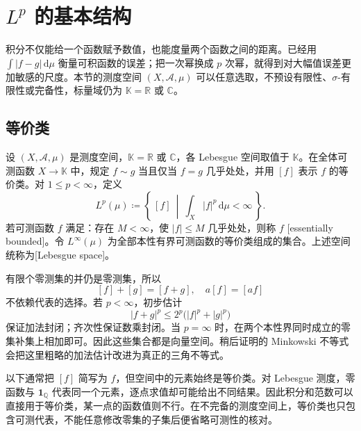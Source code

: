 \section{\texorpdfstring{\(L^p\)}{Lᵖ} 的基本结构}
\label{b1:sec:1001}

积分不仅能给一个函数赋予数值，也能度量两个函数之间的距离。已经用 \(\int|f-g|\,\mathrm d\mu\) 衡量可积函数的误差；把一次幂换成 \(p\) 次幂，就得到对大幅值误差更加敏感的尺度。本节的测度空间 \((X,\mathcal A,\mu)\) 可以任意选取，不预设有限性、\(\sigma\)-有限性或完备性，标量域仍为 \(\mathbb K=\mathbb R\) 或 \(\mathbb C\)。

\subsection{等价类}
\label{b1:subsec:100101}

\begin{definition}\label{b1:def:lp-space}
设 \((X,\mathcal A,\mu)\) 是测度空间，\(\mathbb K=\mathbb R\) 或 \(\mathbb C\)，各 Lebesgue 空间取值于 \(\mathbb K\)。在全体可测函数 \(X\rightarrow\mathbb K\) 中，规定 \(f\sim g\) 当且仅当 \(f=g\) 几乎处处，并用 \([f]\) 表示 \(f\) 的等价类。对 \(1\leq p<\infty\)，定义
\[
 L^p(\mu)\coloneqq\left\{\,[f]\ \middle|\ \int_X|f|^p\,\mathrm d\mu<\infty\,\right\}.
\]
若可测函数 \(f\) 满足：存在 \(M<\infty\)，使 \(|f|\leq M\) 几乎处处，则称 \(f\) [essentially bounded]。令 \(L^\infty(\mu)\) 为全部本性有界可测函数的等价类组成的集合。上述空间统称为[Lebesgue space]。
\end{definition}

有限个零测集的并仍是零测集，所以
\[
 [f]+[g]=[f+g],\quad a[f]=[af]
\]
不依赖代表的选择。若 \(p<\infty\)，初步估计
\[
 |f+g|^p\leq 2^p\bigl(|f|^p+|g|^p\bigr)
\]
保证加法封闭；齐次性保证数乘封闭。当 \(p=\infty\) 时，在两个本性界同时成立的零集补集上相加即可。因此这些集合都是向量空间。稍后证明的 Minkowski 不等式会把这里粗略的加法估计改进为真正的三角不等式。

\ProseParagraphBreak

以下通常把 \([f]\) 简写为 \(f\)，但空间中的元素始终是等价类。对 Lebesgue 测度，零函数与 \(\mathbf1_{\mathbb Q}\) 代表同一个元素，逐点求值却可能给出不同结果。因此积分和范数可以直接用于等价类，某一点的函数值则不行。在不完备的测度空间上，等价类也只包含可测代表，不能任意修改零集的子集后便省略可测性的核对。

